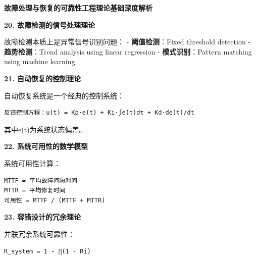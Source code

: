 \begin{Shaded}
\begin{Highlighting}[]
     
        \NormalTok{:}
\OperatorTok{=} 
             
            \NormalTok{)}
             
              \OperatorTok{=}\NormalTok{)}
          
            \NormalTok{(}\SpecialCharTok{\{}\SpecialCharTok{\}}\NormalTok{)}
             
\end{Highlighting}
\end{Shaded}

\textbf{故障处理与恢复的可靠性工程理论基础深度解析}

\textbf{20. 故障检测的信号处理理论}

故障检测本质上是异常信号识别问题： - \textbf{阈值检测}：Fixed threshold detection - \textbf{趋势检测}：Trend analysis using linear regression - \textbf{模式识别}：Pattern matching using machine learning

\textbf{21. 自动恢复的控制理论}

自动恢复系统是一个经典的控制系统：

\begin{verbatim}
反馈控制方程：u(t) = Kp·e(t) + Ki·∫e(τ)dτ + Kd·de(t)/dt
\end{verbatim}

其中e(t)为系统状态偏差。

\textbf{22. 系统可用性的数学模型}

系统可用性计算：

\begin{verbatim}
MTTF = 平均故障间隔时间
MTTR = 平均修复时间
可用性 = MTTF / (MTTF + MTTR)
\end{verbatim}

\textbf{23. 容错设计的冗余理论}

并联冗余系统可靠性：

\begin{verbatim}
R_system = 1 - ∏(1 - Ri)
\end{verbatim}

